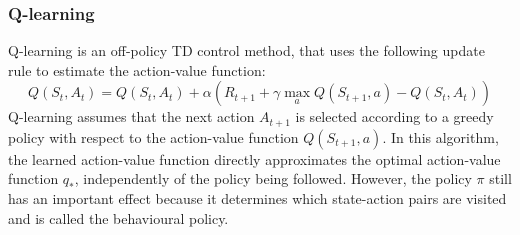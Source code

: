 \subsubsection{Q-learning}
Q-learning is an off-policy TD control method, that uses the following update rule to estimate the action-value function:
\begin{equation}
    Q(S_t, A_t) = Q(S_t, A_t) + \alpha (R_{t+1} + \gamma \max_a{Q(S_{t+1}, a)} - Q(S_t, A_t))
    \label{Q-learning-update}
\end{equation}
Q-learning assumes that the next action $A_{t+1}$ is selected according to a greedy policy with respect to the action-value function $Q(S_{t+1}, a)$. In this algorithm, the learned action-value function directly approximates the optimal action-value function $q_*$, independently of the policy being followed. However, the policy $\pi$ still has an important effect because it determines which state-action pairs are visited and is called the behavioural policy. 
